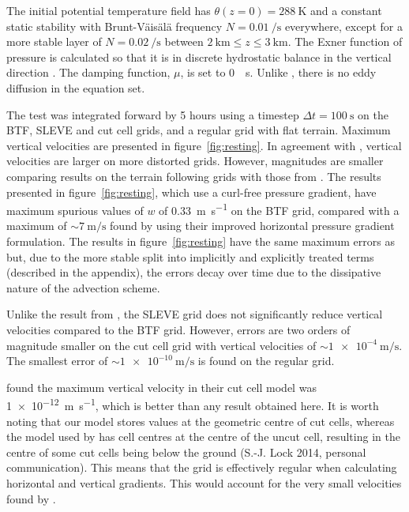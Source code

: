 \documentclass{ametsoc}
\begin{document}
The initial potential temperature field has $\theta(z = 0) = \SI{288}{\kelvin}$ and a constant static stability with Brunt-V\"ais\"al\"a frequency $N = \SI{0.01}{\per\second}$ everywhere, except for a more stable layer of $N = \SI{0.02}{\per\second}$ between $\SI{2}{\kilo\meter} \leq z \leq \SI{3}{\kilo\meter}$.  The Exner function of pressure is calculated so that it is in discrete hydrostatic balance in the vertical direction \citep{weller-shahrokhi2014}.  The damping function, \(\mu\), is set to \SI{0}{\per\second}.  Unlike \citet{klemp2011}, there is no eddy diffusion in the equation set.

The test was integrated forward by 5 hours using a timestep $\Delta t = \SI{100}{\second}$ on the BTF, SLEVE and cut cell grids, and a regular grid with flat terrain.  Maximum vertical velocities are presented in figure~\ref{fig:resting}.  In agreement with \citet{klemp2011}, vertical velocities are larger on more distorted grids.  However, magnitudes are smaller comparing results on the terrain following grids with those from \citet{klemp2011}.  
The results presented in figure~\ref{fig:resting}, which use a curl-free pressure gradient, have maximum spurious values of $w$ of \SI{0.33}{\meter\per\second} on the BTF grid, compared with a maximum of \(\sim \SI{7}{\meter\per\second}\) found by \citet{klemp2011} using their improved horizontal pressure gradient formulation.
The results in figure~\ref{fig:resting} have the same maximum errors as \citet{weller-shahrokhi2014} but, due to the more stable split into implicitly and explicitly treated terms (described in the appendix), the errors decay over time due to the dissipative nature of the advection scheme.

Unlike the result from \citet{klemp2011}, the SLEVE grid does not significantly reduce vertical velocities compared to the BTF grid.  However, errors are two orders of magnitude smaller on the cut cell grid with vertical velocities of \(\sim \SI{1e-4}{\meter\per\second}\).  The smallest error of \(\sim \SI{1e-10}{\meter\per\second}\) is found on the regular grid.

\citet{good2014} found the maximum vertical velocity in their cut cell model was \SI{1e-12}{\meter\per\second}, which is better than any result obtained here.  It is worth noting that our model stores values at the geometric centre of cut cells, whereas the model used by \citet{good2014} has cell centres at the centre of the uncut cell, resulting in the centre of some cut cells being below the ground (S.-J. Lock 2014, personal communication).  This means that the grid is effectively regular when calculating horizontal and vertical gradients.  This would account for the very small velocities found by \citet{good2014}.
\end{document}

